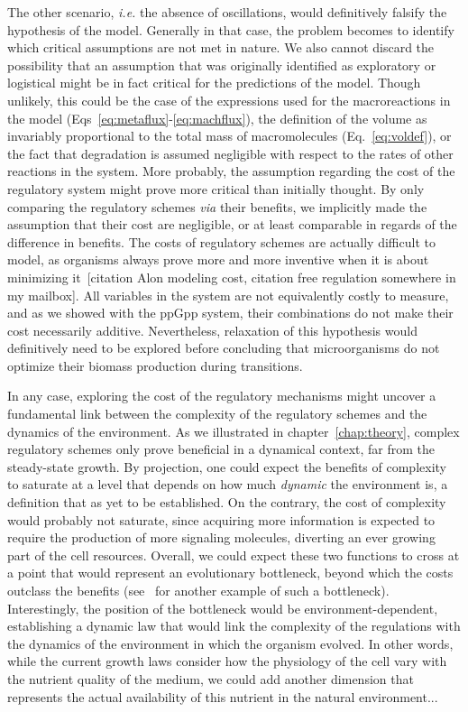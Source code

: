 The other scenario, \textit{i.e.} the absence of oscillations, would definitively falsify the hypothesis of the model.
Generally in that case, the problem becomes to identify which critical assumptions are not met in nature.
We also cannot discard the possibility that an assumption that was originally identified as exploratory or logistical might be in fact critical for the predictions of the model.
Though unlikely, this could be the case of the expressions used for the macroreactions in the model (Eqs~\ref{eq:metaflux}-\ref{eq:machflux}), the definition of the volume as invariably proportional to the total mass of macromolecules (Eq.~\ref{eq:voldef}), or the fact that degradation is assumed negligible with respect to the rates of other reactions in the system.
More probably, the assumption regarding the cost of the regulatory system might prove more critical than initially thought.
By only comparing the regulatory schemes \textit{via} their benefits, we implicitly made the assumption that their cost are negligible, or at least comparable in regards of the difference in benefits.
The costs of regulatory schemes are actually difficult to model, as organisms always prove more and more inventive when it is about minimizing it~[citation Alon modeling cost, citation free regulation somewhere in my mailbox].
All variables in the system are not equivalently costly to measure, and as we showed with the ppGpp system, their combinations do not make their cost necessarily additive.
Nevertheless, relaxation of this hypothesis would definitively need to be explored before concluding that microorganisms do not optimize their biomass production during transitions.

In any case, exploring the cost of the regulatory mechanisms might uncover a fundamental link between the complexity of the regulatory schemes and the dynamics of the environment.
As we illustrated in chapter~\ref{chap:theory}, complex regulatory schemes only prove beneficial in a dynamical context, far from the steady-state growth.
By projection, one could expect the benefits of complexity to saturate at a level that depends on how much \textit{dynamic} the environment is, a definition that as yet to be established.
On the contrary, the cost of complexity would probably not saturate, since acquiring more information is expected to require the production of more signaling molecules, diverting an ever growing part of the cell resources.
Overall, we could expect these two functions to cross at a point that would represent an evolutionary bottleneck, beyond which the costs outclass the benefits (see~\cite{short_flows_2006} for another example of such a bottleneck).
Interestingly, the position of the bottleneck would be environment-dependent, establishing a dynamic law that would link the complexity of the regulations with the dynamics of the environment in which the organism evolved.
In other words, while the current growth laws consider how the physiology of the cell vary with the nutrient quality of the medium, we could add another dimension that represents the actual availability of this nutrient in the natural environment...